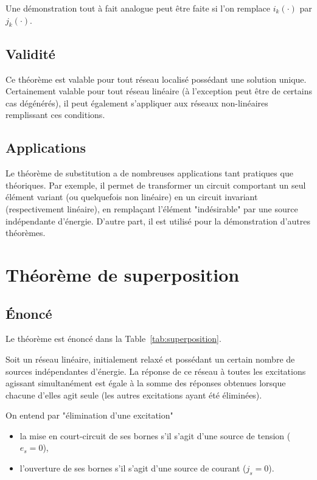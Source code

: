 Une démonstration tout à fait analogue peut être faite si l'on remplace $i_k(\cdot)$ par $j_k(\cdot)$.

\subsection{Validité}
Ce théorème est valable pour tout réseau localisé possédant une solution unique.
Certainement valable pour tout réseau linéaire (à l'exception peut être de certains cas
dégénérés), il peut également s'appliquer aux réseaux non-linéaires remplissant ces conditions.

\subsection{Applications}
Le théorème de substitution a de nombreuses applications tant pratiques que théoriques.
Par exemple, il permet de transformer un circuit comportant un seul élément variant
(ou quelquefois non linéaire) en un circuit invariant (respectivement linéaire), en remplaçant l'élément "indésirable" par une source indépendante d'énergie. D'autre part, il
est utilisé pour la démonstration d'autres théorèmes.

\section{Théorème de superposition}
\subsection{Énoncé}
Le théorème est énoncé dans la Table~\ref{tab:superposition}.
\begin{table}[ht]
\caption{Théorème de superposition.\label{tab:superposition}}
\begin{boxedminipage}{\linewidth}
Soit un réseau linéaire, initialement relaxé et possédant un certain nombre de sources
indépendantes d'énergie. La réponse de ce réseau à toutes les excitations agissant simultanément est égale à la somme des réponses obtenues lorsque chacune d'elles agit seule
(les autres excitations ayant été éliminées). 
\end{boxedminipage}
\end{table}
On entend par "élimination d'une excitation" 
\begin{itemize}
	\item la mise en court-circuit de ses bornes s'il s'agit d'une source de tension ($e_s = 0$),
	\item l'ouverture de ses bornes s'il s'agit d'une source de courant ($j_s = 0$).
\end{itemize}

